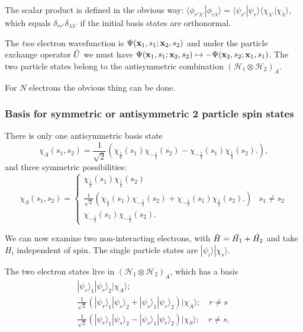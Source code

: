 \documentclass{notes}
\newcommand{\cH}{\mathcal{H}}
\newcommand{\ket}[1]{|#1\rangle}
\newcommand{\scp}[2]{\langle#1|#2\rangle}
\begin{document}
The scalar product is defined in the obvious way:
$\scp{\phi_{r' \lambda'}}{\phi_{r \lambda}} = \scp{\psi_{r'}}{\psi_r}
\scp{\chi_{\lambda'}}{\chi_\lambda}$, which equals $\delta_{r r'}
\delta_{\lambda \lambda'}$ if the initial basis states are orthonormal.

The \emph{two} electron wavefunction is $\Psi(\mathbf{x}_1, s_1; \mathbf{x}_2,
s_2)$ and under the particle exchange operator $\Hat{U}$ we must have
$\Psi(\mathbf{x}_1, s_1; \mathbf{x}_2,s_2) \mapsto
-\Psi(\mathbf{x}_2, s_2; \mathbf{x}_1, s_1)$.  The two particle states belong
to the antisymmetric combination $\left(\cH_1 \otimes \cH_2\right)_A$.

For $N$ electrons the obvious thing can be done.

\subsubsection*{Basis for symmetric or antisymmetric 2 particle spin states}

There is only one antisymmetric basis state
\[
\chi^{}_A(s_1,s_2) = \frac{1}{\sqrt{2}}\left(
\chi^{}_{\frac{1}{2}}(s_1) \chi^{}_{-\frac{1}{2}}(s_2)
- \chi^{}_{-\frac{1}{2}}(s_1) \chi^{}_{\frac{1}{2}}(s_2).
\right),
\]
and three symmetric possibilities:
\[
\chi_S^{}(s_1,s_2) = \begin{cases}
\chi^{}_{\frac{1}{2}}(s_1) \chi^{}_{\frac{1}{2}}(s_2) \\
\frac{1}{\sqrt{2}}\left(
\chi^{}_{\frac{1}{2}}(s_1) \chi^{}_{-\frac{1}{2}}(s_2)
+ \chi^{}_{-\frac{1}{2}}(s_1) \chi^{}_{\frac{1}{2}}(s_2).
\right) & s_1 \neq s_2 \\
\chi^{}_{-\frac{1}{2}}(s_1) \chi^{}_{-\frac{1}{2}}(s_2).
\end{cases}
\]

We can now examine two non-interacting electrons, with
$\Hat{H} = \Hat{H_1} + \Hat{H_2}$ and take $H_i$ independent of spin.
The single particle states are $\ket{\psi_i} \ket{\chi_s}$.

The two electron states live in $\left(\cH_1 \otimes \cH_2\right)_A$,
which has a basis
\begin{gather*}
\ket{\psi_r}_1 \ket{\psi_r}_2 \ket{\chi_A^{}}; \\
\frac{1}{\sqrt{2}} \left( \ket{\psi_r}_1 \ket{\psi_s}_2
+ \ket{\psi_s}_1 \ket{\psi_r}_2
\right) \ket{\chi_A^{}}; \quad r \neq s \\
\frac{1}{\sqrt{2}} \left(
\ket{\psi_r}_1 \ket{\psi_s}_2 -\ket{\psi_s}_1 \ket{\psi_r}_2
\right) \ket{\chi_S^{}};\quad r \neq s,
\end{gather*}
\end{document}
